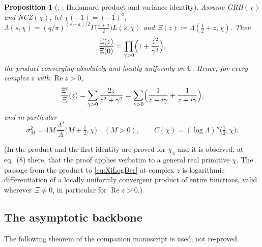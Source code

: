 \documentclass[11pt]{amsart}
\newtheorem{proposition}[theorem]{Proposition}
\theoremstyle{definition}
\numberwithin{equation}{section}
\newcommand{\re}{\operatorname{Re}}
\begin{document}
\begin{proposition}[{\cite[Proposition~2 and eq.~(8)]{WR}};
{\cite[the proposition ``variance identity'']{MC}}; Hadamard product and variance
identity]\label{prop:WRvar}
Assume GRH$(\chi)$ and NCZ$(\chi)$, let $\chi(-1)=(-1)^a$,
$\Lambda(s,\chi)=(q/\pi)^{(s+a)/2}\Gamma\bigl(\tfrac{s+a}2\bigr)
L(s,\chi)$ and $\Xi(z):=\Lambda(\tfrac12+z,\chi)$. Then
\[
\frac{\Xi(z)}{\Xi(0)}=\prod_{\gamma>0}\Bigl(1+\frac{z^2}{\gamma^2}\Bigr),
\]
the product converging absolutely and locally uniformly on
$\mathbb C$. Hence, for every complex $z$ with $\re z>0$,
\begin{equation}\label{eq:XiLogDer}
\frac{\Xi'}{\Xi}(z)=\sum_{\gamma>0}\frac{2z}{z^2+\gamma^2}
=\sum_{\gamma>0}\Bigl(\frac1{z-i\gamma}+\frac1{z+i\gamma}\Bigr),
\end{equation}
and in particular
\[
\sigma_M^2=4M\,\frac{\Lambda'}{\Lambda}\bigl(M+\tfrac12,\chi\bigr)
\quad(M>0),
\qquad
C(\chi)=(\log\Lambda)''\bigl(\tfrac12,\chi\bigr).
\]
\end{proposition}

(In \cite{WR} the product and the first identity are proved for
$\chi_4$ and it is observed, at eq.~(8) there, that the proof applies
verbatim to a general real primitive $\chi$. The passage from the
product to \eqref{eq:XiLogDer} at complex $z$ is logarithmic
differentiation of a locally uniformly convergent product of entire
functions, valid wherever $\Xi\ne0$, in particular for $\re z>0$.)

\subsection{The asymptotic backbone}\label{subsec:backbone}
The following theorem of the companion manuscript is used, not
re-proved.
\end{document}
